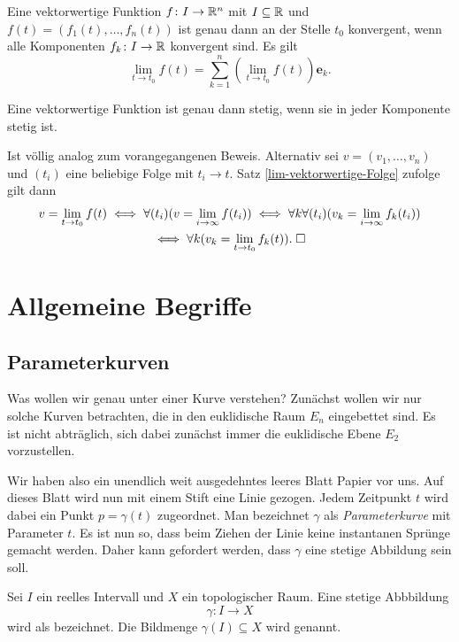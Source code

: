 \begin{theorem}\label{lim-vektorwertige-Funktion}
Eine vektorwertige Funktion $f\colon I\to\mathbb R^n$ mit $I\subseteq\mathbb R$ und
$f(t)=(f_1(t),\ldots,f_n(t))$ ist genau dann an der Stelle $t_0$
konvergent, wenn alle Komponenten $f_k\colon I\to\mathbb R$
konvergent sind. Es gilt%
\begin{equation}
\lim_{t\to t_0} f(t) = \sum_{k=1}^n (\lim_{t\to t_0}f(t))\mathbf e_k.
\end{equation}
\end{theorem}
\begin{corollary}
Eine vektorwertige Funktion ist genau dann stetig, wenn sie in
jeder Komponente stetig ist.
\end{corollary}
 Ist völlig analog zum vorangegangenen Beweis.
Alternativ sei $v=(v_1,\ldots,v_n)$ und $(t_i)$ eine beliebige Folge
mit $t_i\to t$. Satz \ref{lim-vektorwertige-Folge} zufolge gilt dann
\begin{gather}
v = \lim_{t\to t_0} f(t) \iff \forall (t_i)(v=\lim_{i\to\infty} f(t_i))
\iff \forall k\forall(t_i)(v_k = \lim_{i\to\infty} f_k(t_i))\\
\iff \forall k(v_k = \lim_{t\to t_0} f_k(t)).\;\Box
\end{gather}


\section{Allgemeine Begriffe}
\subsection{Parameterkurven}

Was wollen wir genau unter einer Kurve verstehen? Zunächst wollen
wir nur solche Kurven betrachten, die in den euklidische Raum $E_n$
eingebettet sind. Es ist nicht abträglich, sich dabei zunächst immer
die euklidische Ebene $E_2$ vorzustellen.

Wir haben also ein unendlich weit ausgedehntes leeres Blatt Papier
vor uns. Auf dieses Blatt wird nun mit einem Stift eine Linie gezogen.
Jedem Zeitpunkt $t$ wird dabei ein Punkt $p=\gamma(t)$ zugeordnet.
Man bezeichnet $\gamma$ als \emph{Parameterkurve} mit Parameter $t$.
Es ist nun so, dass beim Ziehen der Linie keine instantanen Sprünge
gemacht werden. Daher kann gefordert werden, dass $\gamma$ eine
stetige Abbildung sein soll.

\begin{definition}
Sei $I$ ein reelles Intervall und $X$ ein topologischer Raum.
Eine stetige Abbbildung%
\begin{equation}
\gamma\colon I\to X
\end{equation}
wird als  bezeichnet. Die Bildmenge
$\gamma(I)\subseteq X$ wird  genannt.
\end{definition}


